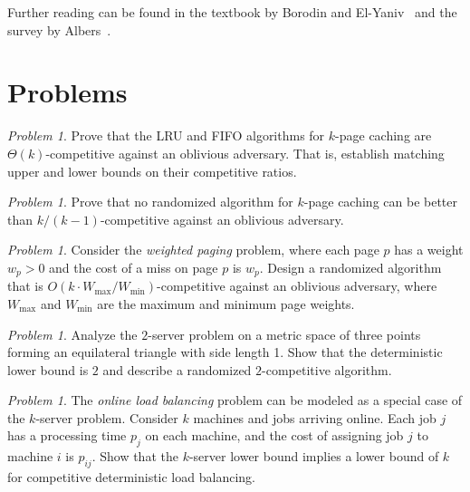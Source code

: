 \documentclass[twoside,12pt]{book}
\theoremstyle{plain}
\theoremstyle{definition}
\theoremstyle{remark}
\newtheorem{problem}[theorem]{Problem}
\begin{document}
Further reading can be found in the textbook by
Borodin and El-Yaniv~\cite{borodin1998online} and the survey by
Albers~\cite{albers2003new}.

\section*{Problems}
\label{sec:online-problems}

\begin{problem}\label{prob:lru-fifo}
Prove that the LRU and FIFO algorithms for $k$-page caching are
$\Theta(k)$-competitive against an oblivious adversary.  That is,
establish matching upper and lower bounds on their competitive ratios.
\end{problem}

\begin{problem}\label{prob:randomized-lb-oblivious}
Prove that no randomized algorithm for $k$-page caching can be better
than $k/(k-1)$-competitive against an oblivious adversary.
\end{problem}

\begin{problem}\label{prob:weighted-paging}
Consider the \emph{weighted paging} problem, where each page $p$ has a
weight $w_p > 0$ and the cost of a miss on page $p$ is $w_p$.  Design a
randomized algorithm that is $O(k \cdot W_{\max}/W_{\min})$-competitive
against an oblivious adversary, where $W_{\max}$ and $W_{\min}$ are the
maximum and minimum page weights.
\end{problem}

\begin{problem}\label{prob:two-server}
Analyze the $2$-server problem on a metric space of three points forming
an equilateral triangle with side length 1.  Show that the deterministic
lower bound is $2$ and describe a randomized $2$-competitive algorithm.
\end{problem}

\begin{problem}\label{prob:load-balancing}
The \emph{online load balancing} problem can be modeled as a special
case of the $k$-server problem.  Consider $k$ machines and jobs arriving
online.  Each job $j$ has a processing time $p_j$ on each machine, and
the cost of assigning job $j$ to machine $i$ is $p_{ij}$.  Show that
the $k$-server lower bound implies a lower bound of $k$ for competitive
deterministic load balancing.
\end{problem}
\end{document}
